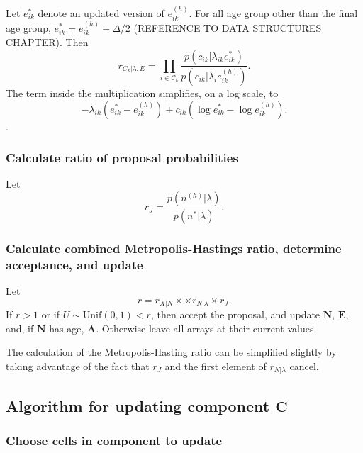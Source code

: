 \documentclass{article}
\begin{document}
Let $e_{ik}^*$ denote an updated version of $e_{ik}^{(h)}$.  For all age group other than the final age group, $e_{ik}^* = e_{ik}^{(h)} + \Delta / 2$ (REFERENCE TO DATA STRUCTURES CHAPTER).  Then
\begin{equation}
  r_{C_k|\lambda, E} =  \prod_{i \in \mathcal{C}_k} \frac{ p(c_{ik} | \lambda_{ik} e_{ik}^*) }{ p(c_{ik} | \lambda_i e_{ik}^{(h)}) }.
\end{equation}
 The term inside the multiplication simplifies, on a log scale, to
\begin{equation}
  - \lambda_{ik} (e_{ik}^*  - e_{ik}^{(h)} ) + c_{ik} (\log e_{ik}^*  - \log e_{ik}^{(h)}).
\end{equation}.


\subsubsection{Calculate ratio of proposal probabilities}

Let
\begin{equation}
  r_J =  \frac{ p(n^{(h)} | \lambda) }{ p(n^* | \lambda) }.
\end{equation}


\subsubsection{Calculate combined Metropolis-Hastings ratio, determine acceptance, and update}

Let
\begin{equation}
  r =  r_{X|N} \times \times r_{N|\lambda} \times r_J.
\end{equation}
If $r > 1$ or if $U \sim \text{Unif}(0,1) < r$, then accept the proposal, and update $\bm{N}$, $\bm{E}$, and, if $\bm{N}$ has age, $\bm{A}$. Otherwise leave all arrays at their current values.

The calculation of the Metropolis-Hasting ratio can be simplified slightly by taking advantage of the fact that  $r_J$ and the first element of $r_{N|\lambda}$ cancel.


\subsection{Algorithm  for updating component $\bm{C}$}

\subsubsection{Choose cells in component to update}
\end{document}

